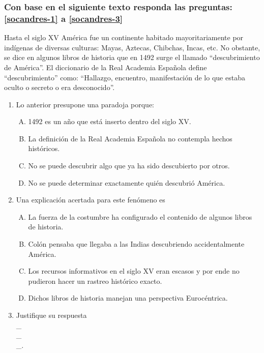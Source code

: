 

\subsubsection*{Con base en el siguiente texto responda las preguntas: \ref{socandres-1} a \ref{socandres-3}}
Hasta el siglo XV América fue un continente habitado mayoritariamente por indígenas de diversas culturas: Mayas, Aztecas, Chibchas, Incas, etc. No obstante, se dice en algunos libros de historia que en 1492 surge el llamado ``descubrimiento de América''. El diccionario de la Real Academia Española define ``descubrimiento'' como: ``Hallazgo, encuentro, manifestación de lo que estaba oculto o secreto o era desconocido''.

\begin{enumerate}
\item Lo anterior presupone una paradoja porque: \label{socandres-1}

\begin{enumerate}[(A)]
\item 1492 es un año que está inserto dentro del siglo XV.
\item La definición de la Real Academia Española no contempla hechos históricos.
\item No se puede descubrir algo que ya ha sido descubierto por otros.
\item No se puede determinar exactamente quién descubrió América.
\end{enumerate}

\item Una explicación acertada para este fenómeno es\label{socandres-2}
\begin{enumerate}[(A)]
\item La fuerza de la costumbre ha configurado el contenido de algunos libros de historia.
\item Colón pensaba que llegaba a las Indias descubriendo accidentalmente América.
\item Los recursos informativos en el siglo XV eran escasos y por ende no pudieron hacer un rastreo histórico exacto.
\item Dichos libros de historia manejan una perspectiva Eurocéntrica.
\end{enumerate}

\item Justifique su respuesta \label{socandres-3} \hrulefill\\
\_\hrulefill\\
\_\hrulefill\\
\_\hrulefill.


\end{enumerate}
